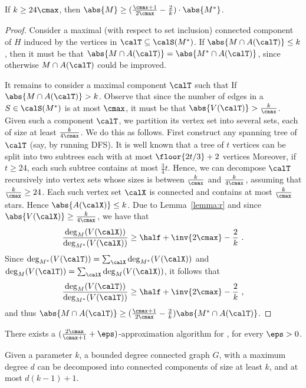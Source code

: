 \begin{lemma}
If $k \geq 24\cmax$, then $\abs{M} \geq (\frac{\cmax+1}{2\cmax}
- \frac{2}{k}) \cdot \abs{M^*}$.
\end{lemma}
\begin{proof}
Consider a maximal (with respect to set inclusion) connected component
of $H$ induced by the vertices in $\calT \subseteq \calS(M^*)$.
%
If $\abs{M \cap A(\calT)} \leq k$, then it must be that $\abs{M \cap
A(\calT)} = \abs{M^* \cap A(\calT)}$, since otherwise $M \cap
A(\calT)$ could be improved.

It remains to consider a maximal component $\calT$ such that If
$\abs{M \cap A(\calT)} > k$.  Observe that since the number of edges
in a $S \in \calS(M^*)$ is at most $\cmax$, it must be that
$\abs{V(\calT)} > \frac{k}{\cmax}$.
%
Given such a component $\calT$, we partition its vertex set into
several sets, each of size at least $\frac{k}{4\cmax}$.  We do this as
follows.  First construct any spanning tree of $\calT$ (say, by
running DFS).  It is well known that a tree of $t$ vertices can be
split into two subtrees each with at most $\floor{2t/3}+2$ vertices
Moreover, if $t \geq 24$, each such subtree
contains at most $\frac{3}{4}t$.  Hence, we can decompose $\calT$
recursively into vertex sets whose sizes is between $\frac{k}{\cmax}$
and $\frac{k}{4\cmax}$, assuming that $\frac{k}{\cmax} \geq 24$.
%
Each such vertex set $\calX$ is connected and contains at most
$\frac{k}{\cmax}$ stars.  Hence $\abs{A(\calX)} \leq k$.  Due to
Lemma~\ref{lemma:r} and since $\abs{V(\calX)} \geq \frac{k}{4\cmax}$,
we have that
\[
\frac{\deg_M(V(\calX))}{\deg_{M^*}(V(\calX))} 
\geq \half + \inv{2\cmax} - \frac{2}{k}
~.
\]
Since $\deg_{M^*}(V(\calT)) = \sum_{\calX} \deg_{M^*}(V(\calX))$ and
$\deg_M(V(\calT)) = \sum_{\calX} \deg_M(V(\calX))$, it follows that
\[
\frac{\deg_M(V(\calT))}{\deg_{M^*}(V(\calT))}
\geq \half + \inv{2\cmax} - \frac{2}{k}
~,
\]
and thus $\abs{M \cap A(\calT)} \geq (\frac{\cmax + 1}{2\cmax}
- \frac{2}{k}) \abs{M^* \cap A(\calT)}$.
\end{proof}


\begin{corollary}
\label{cor:local}
There exists a $(\frac{2\cmax}{\cmax+1} +\eps)$-approximation
algorithm for \carpool, for every $\eps>0$.
\end{corollary}


\iffalse %

\begin{lemma}
\label{lemma:dec}
Given a parameter $k$, a bounded degree connected graph $G$, with a
maximum degree $d$ can be decomposed into connected components of size
at least $k$, and at most $d(k-1) + 1$.
\end{lemma}


